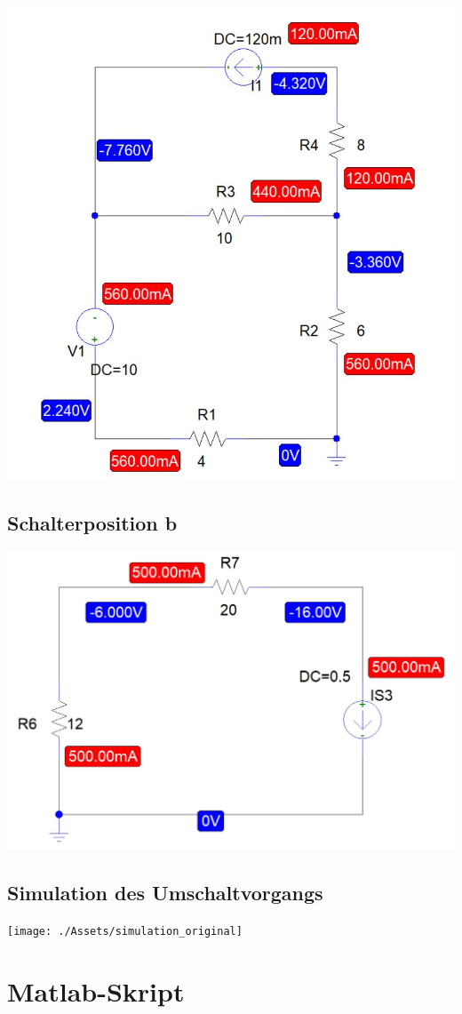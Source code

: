 \documentclass[11pt]{scrartcl}
\begin{document}
\begin{center}
  \includegraphics[width=1\linewidth]{./Assets/Schalterposition a - PSpice}
  \label{fig:a}
\end{center}
\newpage

\subsection{Schalterposition b}
\begin{center}
  \includegraphics[width=1\linewidth]{./Assets/Schalterposition b - PSpice}
  \label{fig:b}
\end{center}

\subsection{Simulation des Umschaltvorgangs}
\begin{center}
  \texttt{[image: ./Assets/simulation\_original]}
  \label{fig:sim_original}
\end{center}

\section{Matlab-Skript}
\end{document}
